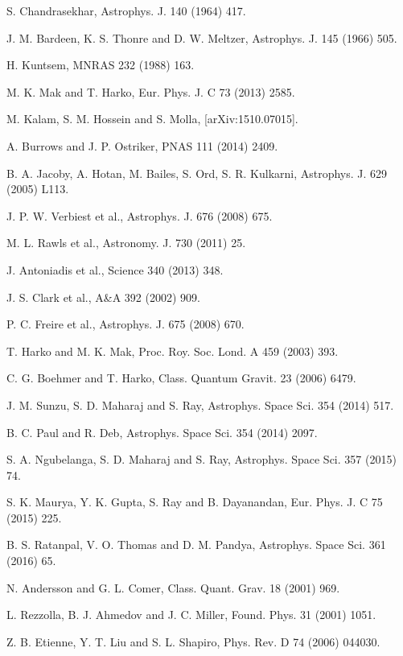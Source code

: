 \documentclass[aps]{revtex4}
\begin{document}
\begin{thebibliography}{999}
 S. Chandrasekhar, Astrophys. J. 140 (1964) 417.

 J. M. Bardeen, K. S. Thonre and D. W. Meltzer,
Astrophys. J. 145 (1966) 505.

 H. Kuntsem, MNRAS 232 (1988) 163.

 M. K. Mak and T. Harko, Eur. Phys. J. C 73 (2013) 2585.

 M. Kalam, S. M. Hossein and S. Molla, [arXiv:1510.07015].

 A. Burrows and J. P. Ostriker, PNAS 111 (2014) 2409.

 B. A. Jacoby, A. Hotan, M. Bailes, S. Ord, S. R. Kulkarni,
Astrophys. J. 629 (2005) L113.

 J. P. W. Verbiest et al., Astrophys. J. 676 (2008) 675.

 M. L. Rawls et al., Astronomy. J. 730 (2011) 25.

 J. Antoniadis et al., Science 340 (2013) 348.

 J. S. Clark et al., A\&A 392 (2002) 909.

 P. C. Freire et al., Astrophys. J. 675 (2008) 670.

 T. Harko and M. K. Mak, Proc. Roy. Soc. Lond. A 459 (2003)
393.

 C. G. Boehmer and T. Harko, Class. Quantum Gravit. 23
(2006) 6479.

 J. M. Sunzu, S. D. Maharaj and S. Ray, Astrophys. Space
Sci. 354 (2014) 517.

 B. C. Paul and R. Deb, Astrophys. Space Sci. 354 (2014) 2097.

 S. A. Ngubelanga, S. D. Maharaj and S. Ray, Astrophys.
Space Sci. 357 (2015) 74.

 S. K. Maurya, Y. K. Gupta, S. Ray and B. Dayanandan, Eur.
Phys. J. C 75 (2015) 225.

 B. S. Ratanpal, V. O. Thomas and D. M. Pandya,
Astrophys. Space Sci. 361 (2016) 65.

 N. Andersson and G. L. Comer, Class. Quant. Grav. 18
(2001) 969.

 L. Rezzolla, B. J. Ahmedov and J. C. Miller, Found. Phys.
31 (2001) 1051.

 Z. B. Etienne, Y. T. Liu and S. L. Shapiro, Phys. Rev. D
74 (2006) 044030.


\end{thebibliography}
\end{document}
